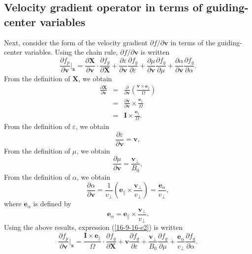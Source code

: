 \documentclass{article}
\newcommand{\nobracket}{}
\newcommand{\tmmathbf}[1]{\ensuremath{\boldsymbol{#1}}}
\begin{document}
\subsection{Velocity gradient operator in terms of guiding-center variables}

Next, consider the form of the velocity gradient $\partial f / \partial
\mathbf{v}$ in terms of the guiding-center variables. Using the chain rule,
$\partial f / \partial \mathbf{v}$ is written
\begin{equation}
  \label{16-9-16-e2} \frac{\partial f_p}{\partial \mathbf{v}} |_{\mathbf{x}}
  \nobracket = \frac{\partial \mathbf{X}}{\partial \mathbf{v}} \cdot
  \frac{\partial f_g}{\partial \mathbf{X}} + \frac{\partial
  \varepsilon}{\partial \mathbf{v}}  \frac{\partial f_g}{\partial \varepsilon}
  + \frac{\partial \mu}{\partial \mathbf{v}}  \frac{\partial f_g}{\partial
  \mu} + \frac{\partial \alpha}{\partial \mathbf{v}}  \frac{\partial
  f_g}{\partial \alpha} .
\end{equation}
From the definition of $\mathbf{X}$, we obtain
\begin{eqnarray}
  \frac{\partial \mathbf{X}}{\partial \mathbf{v}} & = &
  \frac{\partial}{\partial \mathbf{v}} \left( \frac{\tmmathbf{v} \times
  \tmmathbf{e}_{\parallel}}{\Omega} \right) \nonumber\\
  & = &  \frac{\partial \mathbf{v}}{\partial \mathbf{v}} \times
  \frac{\tmmathbf{e}_{\parallel}}{\Omega} \nonumber\\
  & = & \mathbf{I} \times \frac{\tmmathbf{e}_{\parallel}}{\Omega} . 
\end{eqnarray}
From the definition of $\varepsilon$, we obtain
\begin{equation}
  \frac{\partial \varepsilon}{\partial \mathbf{v}} =\mathbf{v},
\end{equation}
From the definition of $\mu$, we obtain
\begin{equation}
  \frac{\partial \mu}{\partial \mathbf{v}} = \frac{\mathbf{v}_{\perp}}{B_0},
\end{equation}
From the definition of $\alpha$, we obtain
\begin{equation}
  \frac{\partial \alpha}{\partial \mathbf{v}} = \frac{1}{v_{\perp}} \left(
  \tmmathbf{e}_{\parallel} \times \frac{\mathbf{v}_{\perp}}{v_{\perp}} \right)
  = \frac{\tmmathbf{e}_{\alpha}}{v_{\perp}},
\end{equation}
where $\mathbf{e}_{\alpha}$ is defined by
\begin{equation}
  \tmmathbf{e}_{\alpha} = \tmmathbf{e}_{\parallel} \times
  \frac{\mathbf{v}_{\perp}}{v_{\perp}} .
\end{equation}
Using the above results, expression (\ref{16-9-16-e2}) is written
\begin{equation}
  \frac{\partial f_p}{\partial \mathbf{v}} |_{\mathbf{x}} \nobracket =
  \frac{\mathbf{I} \times \tmmathbf{e}_{\parallel}}{\Omega} \cdot
  \frac{\partial f_g}{\partial \mathbf{X}} +\mathbf{v} \frac{\partial
  f_g}{\partial \varepsilon} + \frac{\mathbf{v}_{\perp}}{B_0} \frac{\partial
  f_g}{\partial \mu} + \frac{\tmmathbf{e}_{\alpha}}{v_{\perp}}  \frac{\partial
  f_g}{\partial \alpha} .
\end{equation}
\end{document}
